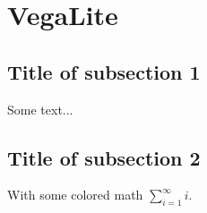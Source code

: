 \section{VegaLite}
\subsection*{Title of subsection 1}
Some text...
\subsection*{Title of subsection 2}
With some colored math $\sum_{i=1}^\infty i$.